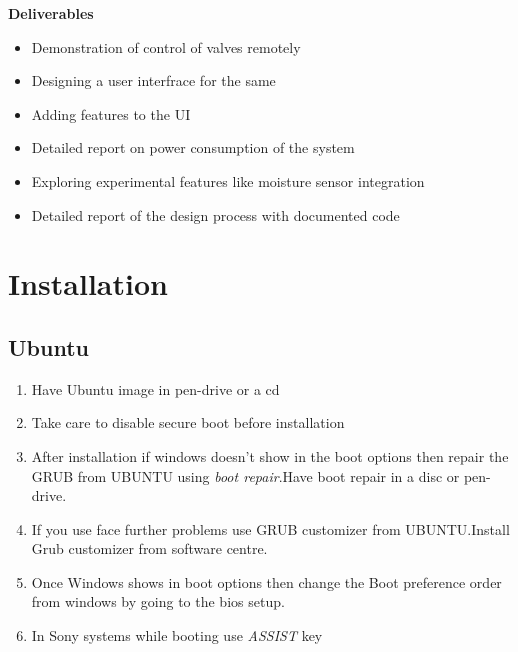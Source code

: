 \documentclass[16pt]{article}
\begin{document}
   \vspace{0.6cm}
   
  {\textbf{Deliverables}}
  
\begin{itemize}
\item Demonstration of control of valves remotely
\item Designing a user interfrace for the same 
\item Adding features to the UI 
\item Detailed report on power consumption of the system
\item Exploring experimental features like moisture sensor integration
\item Detailed report of the design process with documented code
\end{itemize}

\vspace{8cm}

\section{Installation}
 
\vspace{1cm}                                    %


 
\subsection{Ubuntu}

\hfill
  \begin{enumerate}
  \item
    Have Ubuntu image in pen-drive or a cd
  \item
    Take care to disable secure boot before installation
  \item
    After installation if windows doesn't show in the boot options then
    repair the GRUB from UBUNTU using \emph{boot repair}.Have boot repair in a disc or pen-drive.
  \item
    If you use face further problems use GRUB customizer from UBUNTU.Install Grub customizer from software centre.
  \item
    Once Windows shows in boot options then change the Boot preference
    order from windows by going to the bios setup.
  \item
    In Sony systems while booting use \emph{ASSIST} key
  \end{enumerate}
  
\end{document}
